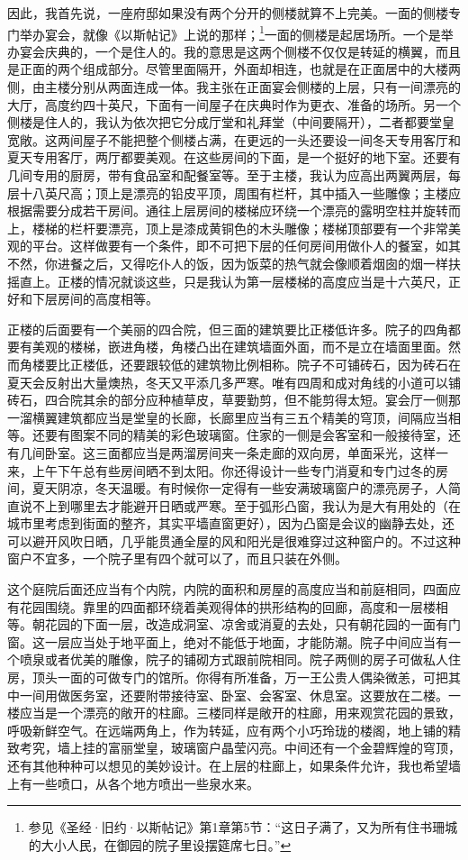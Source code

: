 \par 因此，我首先说，一座府邸如果没有两个分开的侧楼就算不上完美。一面的侧楼专门举办宴会，就像《以斯帖记》上说的那样；\footnote{参见《圣经·旧约·以斯帖记》第1章第5节：“这日子满了，又为所有住书珊城的大小人民，在御园的院子里设摆筵席七日。”}一面的侧楼是起居场所。一个是举办宴会庆典的，一个是住人的。我的意思是这两个侧楼不仅仅是转延的横翼，而且是正面的两个组成部分。尽管里面隔开，外面却相连，也就是在正面居中的大楼两侧，由主楼分别从两面连成一体。我主张在正面宴会侧楼的上层，只有一间漂亮的大厅，高度约四十英尺，下面有一间屋子在庆典时作为更衣、准备的场所。另一个侧楼是住人的，我认为依次把它分成厅堂和礼拜堂（中间要隔开），二者都要堂皇宽敞。这两间屋子不能把整个侧楼占满，在更远的一头还要设一间冬天专用客厅和夏天专用客厅，两厅都要美观。在这些房间的下面，是一个挺好的地下室。还要有几间专用的厨房，带有食品室和配餐室等。至于主楼，我认为应高出两翼两层，每层十八英尺高；顶上是漂亮的铅皮平顶，周围有栏杆，其中插入一些雕像；主楼应根据需要分成若干房间。通往上层房间的楼梯应环绕一个漂亮的露明空柱并旋转而上，楼梯的栏杆要漂亮，顶上是漆成黄铜色的木头雕像；楼梯顶部要有一个非常美观的平台。这样做要有一个条件，即不可把下层的任何房间用做仆人的餐室，如其不然，你进餐之后，又得吃仆人的饭，因为饭菜的热气就会像顺着烟囱的烟一样扶摇直上。正楼的情况就谈这些，只是我认为第一层楼梯的高度应当是十六英尺，正好和下层房间的高度相等。
\par 正楼的后面要有一个美丽的四合院，但三面的建筑要比正楼低许多。院子的四角都要有美观的楼梯，嵌进角楼，角楼凸出在建筑墙面外面，而不是立在墙面里面。然而角楼要比正楼低，还要跟较低的建筑物比例相称。院子不可铺砖石，因为砖石在夏天会反射出大量燠热，冬天又平添几多严寒。唯有四周和成对角线的小道可以铺砖石，四合院其余的部分应种植草皮，草要勤剪，但不能剪得太短。宴会厅一侧那一溜横翼建筑都应当是堂皇的长廊，长廊里应当有三五个精美的穹顶，间隔应当相等。还要有图案不同的精美的彩色玻璃窗。住家的一侧是会客室和一般接待室，还有几间卧室。这三面都应当是两溜房间夹一条走廊的双向房，单面采光，这样一来，上午下午总有些房间晒不到太阳。你还得设计一些专门消夏和专门过冬的房间，夏天阴凉，冬天温暖。有时候你一定得有一些安满玻璃窗户的漂亮房子，人简直说不上到哪里去才能避开日晒或严寒。至于弧形凸窗，我认为是大有用处的（在城市里考虑到街面的整齐，其实平墙直窗更好），因为凸窗是会议的幽静去处，还可以避开风吹日晒，几乎能贯通全屋的风和阳光是很难穿过这种窗户的。不过这种窗户不宜多，一个院子里有四个就可以了，而且只装在外侧。
\par 这个庭院后面还应当有个内院，内院的面积和房屋的高度应当和前庭相同，四面应有花园围绕。靠里的四面都环绕着美观得体的拱形结构的回廊，高度和一层楼相等。朝花园的下面一层，改造成洞室、凉舍或消夏的去处，只有朝花园的一面有门窗。这一层应当处于地平面上，绝对不能低于地面，才能防潮。院子中间应当有一个喷泉或者优美的雕像，院子的铺砌方式跟前院相同。院子两侧的房子可做私人住房，顶头一面的可做专门的馆所。你得有所准备，万一王公贵人偶染微恙，可把其中一间用做医务室，还要附带接待室、卧室、会客室、休息室。这要放在二楼。一楼应当是一个漂亮的敞开的柱廊。三楼同样是敞开的柱廊，用来观赏花园的景致，呼吸新鲜空气。在远端两角上，作为转延，应有两个小巧玲珑的楼阁，地上铺的精致考究，墙上挂的富丽堂皇，玻璃窗户晶莹闪亮。中间还有一个金碧辉煌的穹顶，还有其他种种可以想见的美妙设计。在上层的柱廊上，如果条件允许，我也希望墙上有一些喷口，从各个地方喷出一些泉水来。
